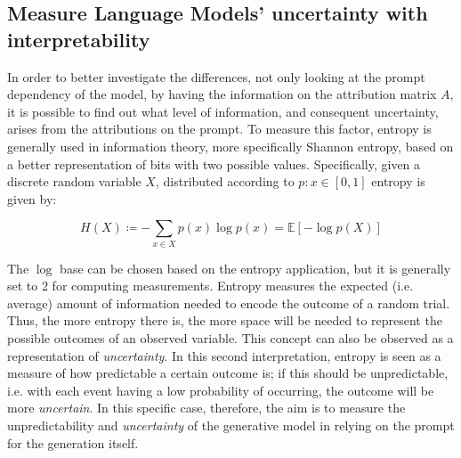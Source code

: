 \subsection{Measure Language Models' uncertainty with interpretability} 
In order to better investigate the differences, not only looking at the prompt dependency of the model, by having the information on the attribution matrix $A$, it is possible to find out what level of information, and consequent uncertainty, arises from the attributions on the prompt. To measure this factor, entropy is generally used in information theory, more specifically Shannon entropy, based on a better representation of bits with two possible values. Specifically, given a discrete random variable $X$, distributed according to $p : x \in [0, 1]$ entropy is given by:

\begin{equation*}
    H (X) \coloneqq - \sum_{x \in X} p(x) \log p(x) = \mathbb{E}[- \log p(X)]
\end{equation*}

The $\log$ base can be chosen based on the entropy application, but it is generally set to 2 for computing measurements. Entropy measures the expected (i.e. average) amount of information needed to encode the outcome of a random trial. Thus, the more entropy there is, the more space will be needed to represent the possible outcomes of an observed variable. This concept can also be observed as a representation of \textit{uncertainty}. In this second interpretation, entropy is seen as a measure of how predictable a certain outcome is; if this should be unpredictable, i.e. with each event having a low probability of occurring, the outcome will be more \textit{uncertain}. In this specific case, therefore, the aim is to measure the unpredictability and \textit{uncertainty} of the generative model in relying on the prompt for the generation itself.


